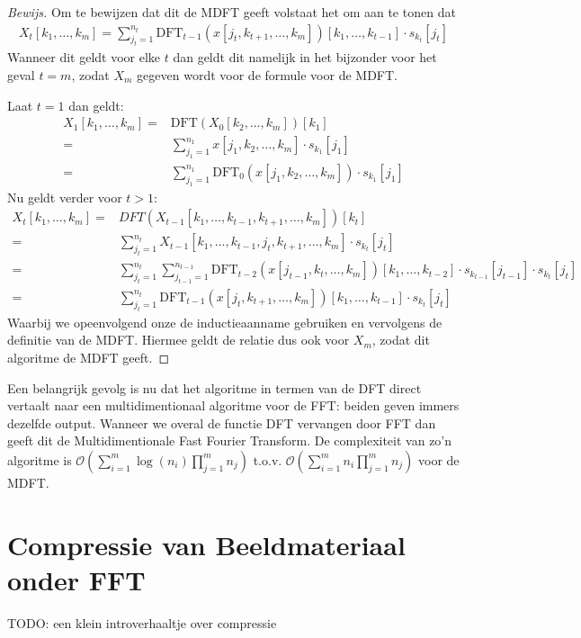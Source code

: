 \documentclass[11pt]{report}
\renewcommand{\O}{\mathcal{O}}
\theoremstyle{plain}
\theoremstyle{remark}
\newcommand{\eq}[1]{\begin{eqnarray*} #1 \end{eqnarray*}}
\newcommand{\DFT}{\text{DFT}}
\begin{document}
\begin{proof}[Bewijs]
Om te bewijzen dat dit de MDFT geeft volstaat het om aan te tonen dat
\eq{
  X_t [k_1,\ldots,k_m] = 
  \sum_{j_t = 1}^{n_t}\DFT_{t-1}(x[j_t,k_{t+1},\ldots,k_m])[k_1,\ldots,k_{t-1}] \cdot s_{k_t}[j_t]
}
Wanneer dit geldt voor elke $t$ dan geldt dit namelijk in het bijzonder voor het geval $t=m$, 
zodat $X_m$ gegeven wordt voor de formule voor de MDFT.

Laat $t=1$ dan geldt:
\eq{
  X_1[k_1,\ldots,k_m] =& \DFT(X_0[k_2,\ldots,k_m])[k_1] \\
 =&  \sum_{j_1=1}^{n_1} x[j_1,k_2,\ldots,k_m]\cdot s_{k_1}[j_1] \\
 =& \sum_{j_1=1}^{n_1} \DFT_0(x[j_1,k_2,\ldots,k_m])\cdot s_{k_1}[j_1]
}
Nu geldt verder voor $t>1$:
\eq{
  X_t[k_1,\ldots,k_m] =& DFT(X_{t-1}[k_1,\ldots,k_{t-1},k_{t+1},\ldots,k_m])[k_t] \\
           =& \sum_{j_t =1}^{n_t} X_{t-1}[k_1,\ldots,k_{t-1},j_t,k_{t+1},\ldots,k_m] \cdot s_{k_t}[j_t] \\
           =& \sum_{j_t =1}^{n_t} 
           \sum_{j_{t-1} = 1}^{n_{t-1}}
           \DFT_{t-2}(x[j_{t-1},k_t,\ldots,k_m])[k_1,\ldots,k_{t-2}] \cdot s_{k_{t-1}}[j_{t-1}]
                         \cdot s_{k_t}[j_t] \\
=&  \sum_{j_t = 1}^{n_t}\DFT_{t-1}(x[j_t,k_{t+1},\ldots,k_m])[k_1,\ldots,k_{t-1}] \cdot s_{k_t}[j_t]
}
Waarbij we opeenvolgend onze de inductieaanname gebruiken en vervolgens de definitie van de MDFT.
Hiermee geldt de relatie dus ook voor $X_m$, zodat dit algoritme de MDFT geeft.
\end{proof}

Een belangrijk gevolg is nu dat het algoritme in termen van de DFT direct vertaalt naar een multidimentionaal algoritme voor de FFT: beiden geven immers dezelfde output. 
Wanneer we overal de functie DFT vervangen door FFT dan geeft dit de Multidimentionale Fast Fourier Transform.
De complexiteit van zo'n algoritme is $\O( \sum_{i=1}^m \log(n_i) \prod_{j=1}^m n_j)$ t.o.v.
$\O( \sum_{i=1}^m n_i \prod_{j=1}^m n_j)$ voor de MDFT.

\section{Compressie van Beeldmateriaal onder FFT}

TODO: een klein introverhaaltje over compressie
\end{document}
